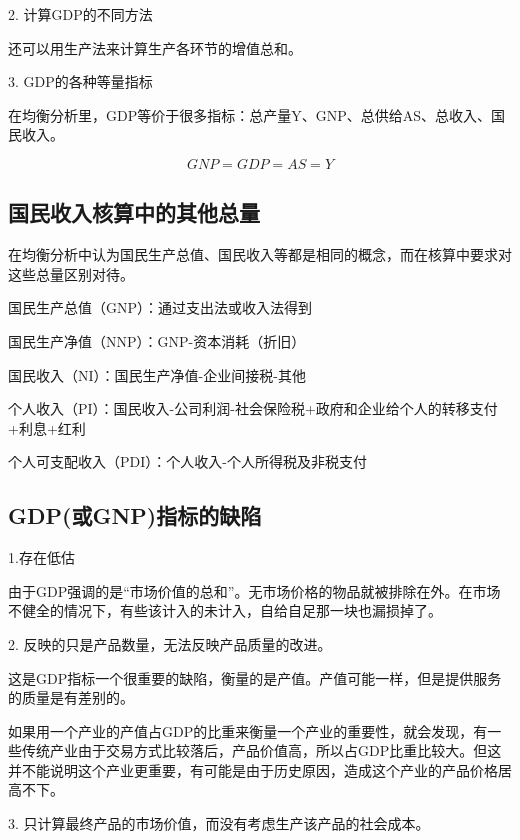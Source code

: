 \documentclass{article}
\begin{document}
\hspace*{\fill}

2. 计算GDP的不同方法

还可以用生产法来计算生产各环节的增值总和。

\hspace*{\fill}

3. GDP的各种等量指标

在均衡分析里，GDP等价于很多指标：总产量Y、GNP、总供给AS、总收入、国民收入。

\[
GNP=GDP=AS=Y
\]

\subsection{国民收入核算中的其他总量}

在均衡分析中认为国民生产总值、国民收入等都是相同的概念，而在核算中要求对这些总量区别对待。

国民生产总值（GNP）：通过支出法或收入法得到

国民生产净值（NNP）：GNP-资本消耗（折旧）

国民收入（NI）：国民生产净值-企业间接税-其他

个人收入（PI）：国民收入-公司利润-社会保险税+政府和企业给个人的转移支付+利息+红利

个人可支配收入（PDI）：个人收入-个人所得税及非税支付

\subsection{GDP(或GNP)指标的缺陷}
1.存在低估

由于GDP强调的是“市场价值的总和”。无市场价格的物品就被排除在外。在市场不健全的情况下，有些该计入的未计入，自给自足那一块也漏损掉了。

\hspace*{\fill}

2. 反映的只是产品数量，无法反映产品质量的改进。

这是GDP指标一个很重要的缺陷，衡量的是产值。产值可能一样，但是提供服务的质量是有差别的。

如果用一个产业的产值占GDP的比重来衡量一个产业的重要性，就会发现，有一些传统产业由于交易方式比较落后，产品价值高，所以占GDP比重比较大。但这并不能说明这个产业更重要，有可能是由于历史原因，造成这个产业的产品价格居高不下。

\hspace*{\fill}

3. 只计算最终产品的市场价值，而没有考虑生产该产品的社会成本。
\end{document}
